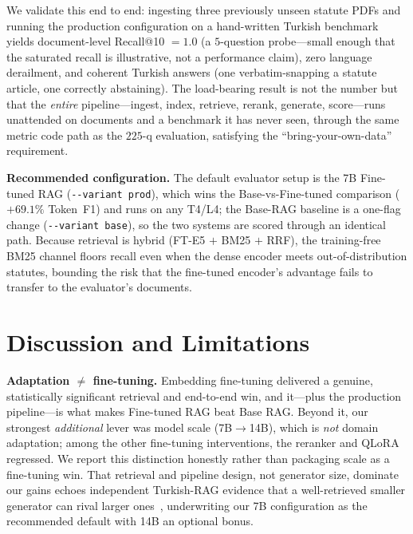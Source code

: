 \documentclass[conference]{IEEEtran}
\begin{document}
We validate this end to end: ingesting three previously unseen statute PDFs and
running the production configuration on a hand-written Turkish benchmark yields
document-level Recall@10 $=1.0$ (a $5$-question probe---small enough that the
saturated recall is illustrative, not a performance claim), zero language
derailment, and coherent Turkish answers (one verbatim-snapping a statute
article, one correctly abstaining). The load-bearing result is not the number
but that the \emph{entire} pipeline---ingest, index, retrieve, rerank, generate,
score---runs unattended on documents and a benchmark it has never seen, through
the same metric code path as the $225$-q evaluation, satisfying the
``bring-your-own-data'' requirement.

\textbf{Recommended configuration.} The default evaluator setup is the 7B
Fine-tuned RAG (\texttt{-{}-variant prod}), which wins the Base-vs-Fine-tuned
comparison ($+69.1\%$ Token~F1) and runs on any T4/L4; the Base-RAG baseline is a
one-flag change (\texttt{-{}-variant base}), so the two systems are scored through
an identical path. Because retrieval is hybrid (FT-E5 $+$ BM25 $+$ RRF), the
training-free BM25 channel floors recall even when the dense encoder meets
out-of-distribution statutes, bounding the risk that the fine-tuned encoder's
advantage fails to transfer to the evaluator's documents.

\section{Discussion and Limitations}
\label{sec:disc}
\textbf{Adaptation $\neq$ fine-tuning.} Embedding fine-tuning delivered a
genuine, statistically significant retrieval and end-to-end win, and it---plus
the production pipeline---is what makes Fine-tuned RAG beat Base RAG. Beyond it,
our strongest \emph{additional} lever was model scale (7B$\rightarrow$14B), which
is \emph{not} domain adaptation; among the other fine-tuning interventions, the
reranker and QLoRA regressed. We report this distinction honestly rather than
packaging scale as a fine-tuning win. That retrieval and pipeline design, not
generator size, dominate our gains echoes independent Turkish-RAG evidence that
a well-retrieved smaller generator can rival larger ones~\cite{atagun2025rag},
underwriting our 7B configuration as the recommended default with 14B an
optional bonus.
\end{document}
